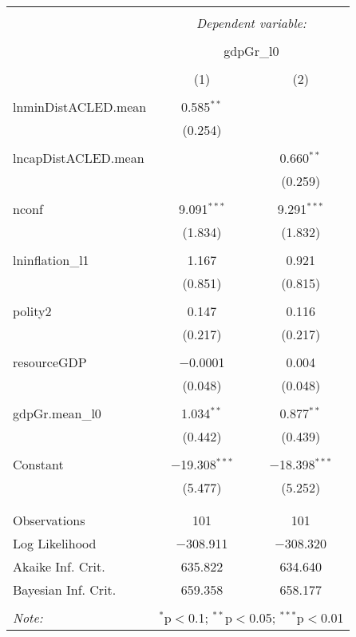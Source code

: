 
\begin{table}[!htbp] \centering 
  \caption{} 
  \label{} 
\begin{tabular}{@{\extracolsep{5pt}}lcc} 
\\[-1.8ex]\hline 
\hline \\[-1.8ex] 
 & \multicolumn{2}{c}{\textit{Dependent variable:}} \\ 
\cline{2-3} 
\\[-1.8ex] & \multicolumn{2}{c}{gdpGr\_l0} \\ 
\\[-1.8ex] & (1) & (2)\\ 
\hline \\[-1.8ex] 
 lnminDistACLED.mean & 0.585$^{**}$ &  \\ 
  & (0.254) &  \\ 
  & & \\ 
 lncapDistACLED.mean &  & 0.660$^{**}$ \\ 
  &  & (0.259) \\ 
  & & \\ 
 nconf & 9.091$^{***}$ & 9.291$^{***}$ \\ 
  & (1.834) & (1.832) \\ 
  & & \\ 
 lninflation\_l1 & 1.167 & 0.921 \\ 
  & (0.851) & (0.815) \\ 
  & & \\ 
 polity2 & 0.147 & 0.116 \\ 
  & (0.217) & (0.217) \\ 
  & & \\ 
 resourceGDP & $-$0.0001 & 0.004 \\ 
  & (0.048) & (0.048) \\ 
  & & \\ 
 gdpGr.mean\_l0 & 1.034$^{**}$ & 0.877$^{**}$ \\ 
  & (0.442) & (0.439) \\ 
  & & \\ 
 Constant & $-$19.308$^{***}$ & $-$18.398$^{***}$ \\ 
  & (5.477) & (5.252) \\ 
  & & \\ 
\hline \\[-1.8ex] 
Observations & 101 & 101 \\ 
Log Likelihood & $-$308.911 & $-$308.320 \\ 
Akaike Inf. Crit. & 635.822 & 634.640 \\ 
Bayesian Inf. Crit. & 659.358 & 658.177 \\ 
\hline 
\hline \\[-1.8ex] 
\textit{Note:}  & \multicolumn{2}{r}{$^{*}$p$<$0.1; $^{**}$p$<$0.05; $^{***}$p$<$0.01} \\ 
\end{tabular} 
\end{table}  
